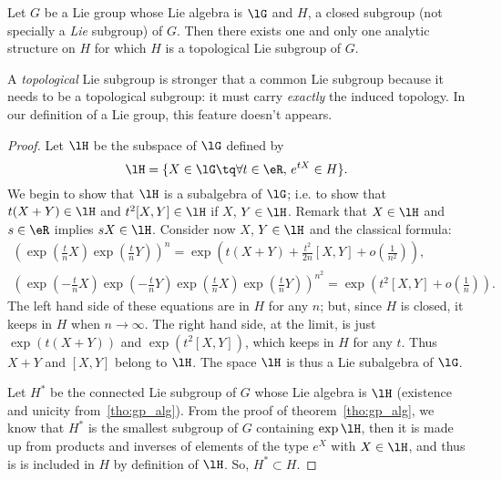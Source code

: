 \begin{theorem}
Let $G$ be a Lie group whose Lie algebra is $\lG$ and $H$, a closed subgroup (not specially a \emph{Lie} subgroup) of $G$. Then there exists one and only one analytic structure on $H$ for which $H$ is a topological Lie subgroup of $G$.
\label{tho:diff_sur_ferme}
\end{theorem}

\begin{remark}
A \textit{topological} Lie subgroup is stronger that a common Lie subgroup because it needs to be a topological subgroup: it must carry \emph{exactly} the induced topology. In our definition of a Lie group, this feature doesn't appears.
\end{remark}

\begin{proof}
   Let $\lH$ be the subspace of $\lG$ defined by
\begin{equation}\label{eq:lH_de_G}
  \lH=\{X\in\lG\tq \forall t\in\eR,\, e^{tX}\in H\}.
\end{equation}
We begin to show that $\lH$ is a subalgebra of $\lG$; i.e. to show that $t(X+Y)\in\lH$ and $t^2[X,Y]\in\lH$ if $X$, $Y\in\lH$. Remark that $X\in\lH$ and $s\in\eR$ implies $sX\in\lH$. Consider now $X$, $Y\in\lH$ and the classical formula:
\begin{subequations}
\begin{align}
\left(  \exp(\frac{t}{n}X)\exp(\frac{t}{n}Y)  \right )^n
                       =\exp( t(X+Y)+\frac{t^2}{2n}[X,Y]+o(\frac{1}{n^2}) ),\\
\left(  \exp(-\frac{t}{n}X)\exp(-\frac{t}{n}Y)\exp(\frac{t}{n}X)\exp(\frac{t}{n}Y)   \right)^{n^2}
                       =\exp\left( t^2[X,Y]+o(\frac{1}{n})\right).
\end{align}
\end{subequations}
The left hand side of these equations are in $H$ for any $n$; but, since $H$ is closed, it keeps in $H$ when $n\to\infty$. The right hand side, at the limit, is just $\exp(t(X+Y))$ and $\exp(t^2[X,Y])$, which keeps in $H$ for any $t$. Thus $X+Y$ and $[X,Y]$ belong to $\lH$. The space $\lH$ is thus a Lie subalgebra of $\lG$.

Let $H^*$ be the connected Lie subgroup of $G$ whose Lie algebra is $\lH$ (existence and unicity from~\ref{tho:gp_alg}). From the proof of theorem~\ref{tho:gp_alg}, we know that $H^*$ is the smallest subgroup of $G$ containing $\exp\lH$, then it is made up from products and inverses of elements of the type $e^X$ with $X\in\lH$, and thus is is included in $H$ by definition of $\lH$. So, $H^*\subset H$.


\end{proof}
